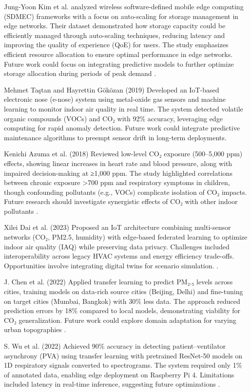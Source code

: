 Jung-Yoon Kim et al. analyzed wireless software-defined mobile edge computing (SDMEC) frameworks with a focus on auto-scaling for storage management in edge networks. Their dataset demonstrated how storage capacity could be efficiently managed through auto-scaling techniques, reducing latency and improving the quality of experience (QoE) for users. The study emphasizes efficient resource allocation to ensure optimal performance in edge networks. Future work could focus on integrating predictive models to further optimize storage allocation during periods of peak demand \cite{17}.


Mehmet Taştan and Hayrettin Göközan (2019)
Developed an IoT-based electronic nose (e-nose) system using metal-oxide gas sensors and machine learning to monitor indoor air quality in real time. The system detected volatile organic compounds (VOCs) and CO₂ with 92\% accuracy, leveraging edge computing for rapid anomaly detection. Future work could integrate predictive maintenance algorithms to preempt sensor drift in long-term deployments\cite{18}.

 Kenichi Azuma et al. (2018)
Reviewed low-level CO₂ exposure (500–5,000 ppm) effects, showing linear increases in heart rate and blood pressure, along with impaired decision-making at ≥1,000 ppm. The study highlighted correlations between chronic exposure >700 ppm and respiratory symptoms in children, though confounding pollutants (e.g., VOCs) complicate isolation of CO₂ impacts. Future research should investigate synergistic effects of CO₂ with other indoor pollutants \cite{19}.

 Xilei Dai et al. (2023)
Proposed an IoT architecture combining multi-sensor networks (CO₂, PM2.5, humidity) with edge-based federated learning to optimize indoor air quality (IAQ) while preserving data privacy. Challenges included interoperability across legacy HVAC systems and energy efficiency trade-offs. Opportunities involve integrating digital twins for scenario simulation. \cite{20}.

 J. Chen et al. (2022)
Applied transfer learning to predict PM₂.₅ levels across cities, training models on data-rich source cities (Beijing, Delhi) and fine-tuning on target cities (Mumbai, Bangkok) with 30\% less data. The approach reduced prediction errors by 18\% compared to local models, demonstrating viability for CO₂ generalization. Future work could explore domain adaptation for varying urban topographies \cite{21}.

 S. Wu et al. (2022)
Achieved 90\% accuracy in detecting patient–ventilator asynchrony (PVA) using transfer learning with pretrained ResNet-50 models on 1D respiratory signals converted to spectrograms. The system required only 1\% of annotated data, enabling edge deployment on Raspberry Pi 4. Limitations included latency in real-time inference, suggesting future optimizations \cite{22}.

